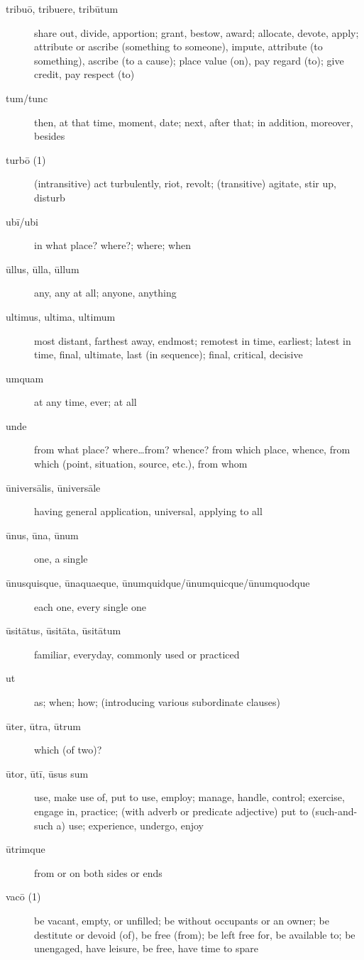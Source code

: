 \begin{description}
    \item[tribuō, tribuere, tribūtum] share out, divide, apportion; grant, bestow, award; allocate, devote, apply; attribute or ascribe (something to someone), impute, attribute (to something), ascribe (to a cause); place value (on), pay regard (to); give credit, pay respect (to)
    \item[tum/tunc] \marginnote{*}then, at that time, moment, date; next, after that; in addition, moreover, besides
    \item[turbō (1)] \marginnote{*}(intransitive) act turbulently, riot, revolt; (transitive) agitate, stir up, disturb
    \item[ubī/ubi] \marginnote{*}in what place? where?; where; when
    \item[ūllus, ūlla, ūllum] \marginnote{*}any, any at all; anyone, anything
    \item[ultimus, ultima, ultimum] \marginnote{*}most distant, farthest away, endmost; remotest in time, earliest; latest in time, final, ultimate, last (in sequence); final, critical, decisive
    \item[umquam] \marginnote{*}at any time, ever; at all
    \item[unde] \marginnote{*}from what place? where\dots from? whence? from which place, whence, from which (point, situation, source, etc.), from whom
    \item[ūniversālis, ūniversāle] having general application, universal, applying to all
    \item[ūnus, ūna, ūnum] \marginnote{*}one, a single
    \item[ūnusquisque, ūnaquaeque, ūnumquidque/ūnumquicque/ūnumquodque] each one, every single one
    \item[ūsitātus, ūsitāta, ūsitātum] familiar, everyday, commonly used or practiced
    \item[ut] \marginnote{*}as; when; how; (introducing various subordinate clauses)
    \item[ūter, ūtra, ūtrum] which (of two)?
    \item[ūtor, ūtī, ūsus sum] \marginnote{*}use, make use of, put to use, employ; manage, handle, control; exercise, engage in, practice; (with adverb or predicate adjective) put to (such-and-such a) use; experience, undergo, enjoy
    \item[ūtrimque] from or on both sides or ends
    \item[vacō (1)] be vacant, empty, or unfilled; be without occupants or an owner; be destitute or devoid (of), be free (from); be left free for, be available to; be unengaged, have leisure, be free, have time to spare

\end{description}
